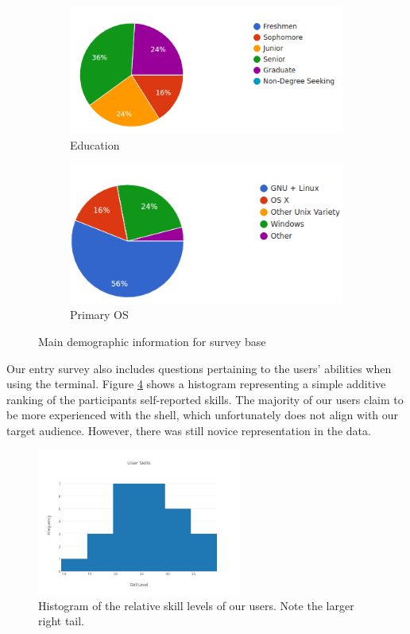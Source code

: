 \begin{figure}[ht]
  \begin{subfigure}[b]{0.45\textwidth}
\includegraphics[width=\textwidth]{figures/stats/edu.png}
    \caption{Education}
    \label{fig:edu}
  \end{subfigure}
  \quad
  \begin{subfigure}[b]{0.45\textwidth}
    \includegraphics[width=\textwidth]{figures/stats/os.png}
    \caption{Primary OS}
    \label{fig:OS}
  \end{subfigure}
  \caption{Main demographic information for survey base}
\end{figure}

Our entry survey also includes questions pertaining to the users' abilities when
using the terminal. Figure \ref{fig:skillz} shows a histogram representing a
simple additive ranking of the participants self-reported skills. The majority
of our users claim to be more experienced with the shell, which unfortunately
does not align with our target audience. However, there was still novice
representation in the data.

\begin{figure}[H]
  \centering
  \includegraphics[width=0.6\textwidth]{figures/stats/user-skills.png}
  \caption{Histogram of the relative skill levels of our users. Note the larger
    right tail.}
  \label{fig:skillz}
\end{figure}


